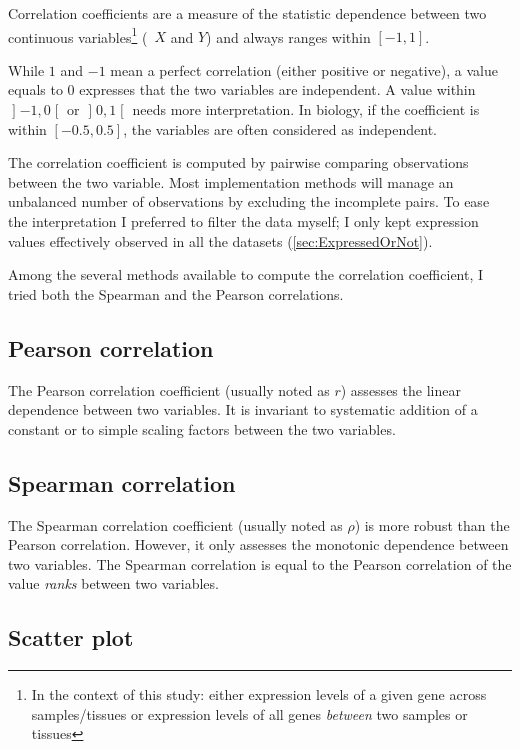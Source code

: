 
Correlation coefficients are a measure of the statistic dependence between two
continuous variables\footnote{In the context of this study: either expression
levels of a given gene across samples/tissues or expression levels of all genes
\emph{between} two samples or tissues} (\eg\
$X$ and $Y$) and always ranges within $[-1,1]$.

While $1$ and $-1$ mean a perfect correlation (either positive or negative),
a value equals to $0$ expresses that the two variables are independent.
A value within $\mathopen]-1,0\mathclose[$
or $\mathopen]0,1\mathclose[$ needs more interpretation. In biology, if the
coefficient is within $[-0.5,0.5]$, the variables are often considered as
independent.

The correlation coefficient is computed by pairwise comparing observations
between the two variable. Most implementation methods
will manage an unbalanced number of observations by excluding the incomplete pairs.
To ease the interpretation I preferred to filter the data \latin{a priori}
myself; I only kept expression values effectively observed in all the datasets
(\cref{sec:ExpressedOrNot}).

Among the several methods available to compute the correlation coefficient, I
tried both the Spearman and the Pearson correlations.

\subsection{Pearson correlation}
The Pearson correlation coefficient (usually noted as $r$) assesses the linear
dependence between two variables. It is invariant to systematic addition of a
constant or to simple scaling factors between the two variables.

\subsection{Spearman correlation}
The Spearman correlation coefficient (usually noted as $\rho$)
is more robust than the Pearson correlation.
However, it only assesses the monotonic dependence between two variables.
The Spearman correlation is equal to the Pearson correlation of the value
\emph{ranks} between two variables.


\subsection{Scatter plot}

